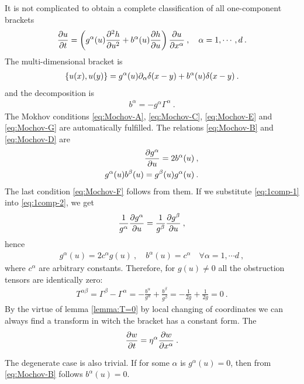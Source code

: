 \begin{example}
    

It is not complicated to obtain a complete classification of all one-component brackets
\begin{align}
    \frac{\partial u}{\partial t} = \left( g^{\alpha}(u) \frac{\partial ^2h}{\partial u^2} + b^{\alpha}(u) \frac{\partial h}{\partial u} \right) \frac{\partial u}{\partial x^\alpha} \:, \quad \alpha = 1, \cdots, d \:.
\end{align}
The multi-dimensional bracket is 
\begin{align}
    \left \lbrace u(x),u(y) \right \rbrace = g^{\alpha}(u) \partial_\alpha \delta(x-y) + b^\alpha(u) \delta(x-y) \:.
\end{align}
and the decomposition is
\begin{align}
    b^\alpha = - g^\alpha \Gamma^\alpha \:.
\end{align}
The Mokhov conditions \eqref{eq:Mochov-A}, \eqref{eq:Mochov-C}, \eqref{eq:Mochov-E} and \eqref{eq:Mochov-G} are automatically fulfilled. The relations \eqref{eq:Mochov-B} and \eqref{eq:Mochov-D} are
\begin{align}
    \frac{\partial g^\alpha}{\partial u} = 2 b^\alpha(u) \:, \label{eq:1comp-1} \\
    g^\alpha(u) b^\beta(u) = g^\beta(u) g^\alpha(u) \label{eq:1comp-2}\:.
\end{align}
The last condition \eqref{eq:Mochov-F} follows from them. If we substitute \eqref{eq:1comp-1} into \eqref{eq:1comp-2}, we get
\begin{align}
    \frac{1}{g^\alpha} \frac{\partial g^\alpha}{\partial u}= \frac{1}{g^\beta}\frac{\partial g^\beta}{\partial u} \:,
\end{align}
hence
\begin{align}
    g^\alpha(u) = 2c^\alpha g(u) \:, \quad b^\alpha(u) = c^\alpha \quad \forall \alpha = 1, \cdots d \:,
\end{align}
where $c^\alpha$ are arbitrary constants.
Therefore, for $g(u) \neq 0$ all the obstruction tensors are identically zero:
\begin{align}
    T^{\alpha \beta} = \Gamma^\beta - \Gamma^\alpha = -\frac{b^\alpha}{g^\alpha} + \frac{b^\beta}{g^\beta} = - \frac{1}{2 g} + \frac{1}{2g} = 0 \:.
\end{align}
By the virtue of lemma \vref{lemma:T=0} by local changing of coordinates we can always find a transform in witch the bracket has a constant form. The 
\begin{align}
    \frac{\partial w}{\partial t} = \eta^\alpha \frac{\partial w}{\partial x^\alpha} \:.
\end{align}

The degenerate case is also trivial. If for some $\alpha$ is $g^\alpha(u) = 0$, then from \eqref{eq:Mochov-B} follows $b^\alpha(u) = 0$.

\end{example}

